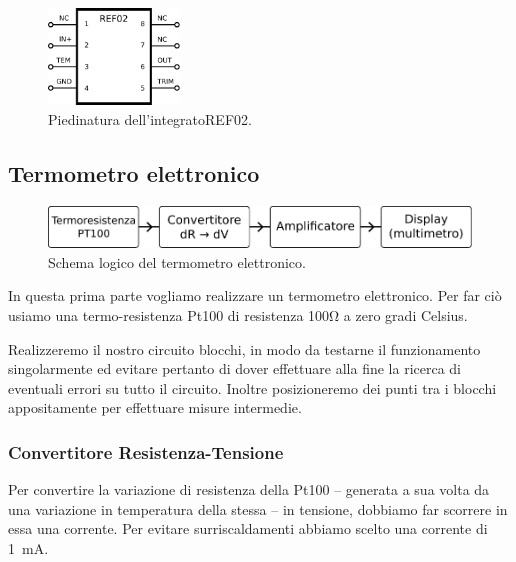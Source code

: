 \begin{figure}[htc]
\begin{itemize} [noitemsep]
\begin{minipage}{0.65\textwidth}
	\end{minipage}
	\begin{minipage}{0.3\textwidth}
			\centering
			\includegraphics[width=3.5cm]{../E06/latex/REF02.pdf}
			\caption{Piedinatura dell'integrato\newline REF02.}
			\label{cir6:REF02}
	\end{minipage}
\end{itemize}
\end{figure}
\vspace{-.8cm}

\subsection{Termometro elettronico}

\begin{figure}
\centering
\includegraphics[width=.6\textwidth]{../E06/latex/s1.pdf}
\caption{Schema logico del termometro elettronico.}
\label{fig6:scheme1}
\end{figure}

In questa prima parte vogliamo realizzare un termometro elettronico.
Per far ciò usiamo una termo-resistenza Pt100 di resistenza 100\si{\ohm} a zero gradi Celsius.

Realizzeremo il nostro circuito blocchi, in modo da testarne il funzionamento singolarmente ed evitare pertanto di dover effettuare alla fine la ricerca di eventuali errori su tutto il circuito.
Inoltre posizioneremo dei punti tra i blocchi appositamente per effettuare misure intermedie.

\subsubsection{Convertitore Resistenza-Tensione}
Per convertire la variazione di resistenza della Pt100 -- generata a sua volta da una variazione in temperatura della stessa -- in tensione, dobbiamo far scorrere in essa una corrente.
Per evitare surriscaldamenti abbiamo scelto una corrente di \SI{1}{\milli\ampere}.

